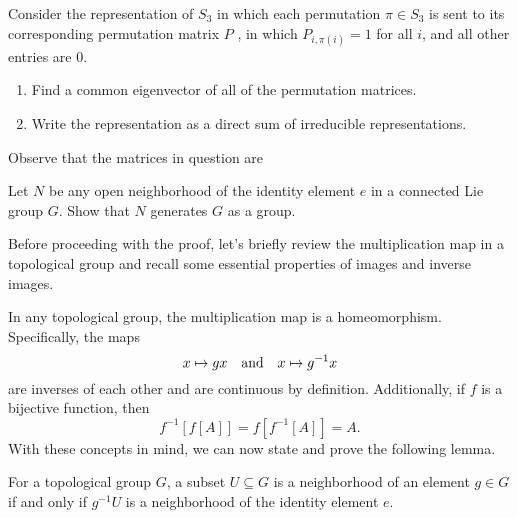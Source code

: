 \documentclass[12pt]{memoir}
\begin{document}
\begin{Ej}
    Consider the representation of $S_3$ in which each permutation $\pi\in S_3$ is sent to its corresponding permutation matrix $P$ , in which $P_{i,\pi(i)}=1$ for all $i$, and all other entries are $0$.
    \begin{enumerate}
        \item Find a common eigenvector of all of the permutation matrices.
        \item Write the representation as a direct sum of irreducible representations.
    \end{enumerate}
\end{Ej}

\begin{ptcbr}
    Observe that the matrices in question are 
\end{ptcbr}
\begin{Ej}
    Let $N$ be any open neighborhood of the identity element $e$ in a connected Lie group $G$.
Show that $N$ generates $G$ as a group.
\end{Ej}



Before proceeding with the proof, let's briefly review the multiplication map in a topological group and recall some essential properties of images and inverse images.

\begin{Rmk}
In any topological group, the multiplication map is a homeomorphism. Specifically, the maps 
$$x \mapsto gx \quad\text{and}\quad x \mapsto g^{-1}x$$
are inverses of each other and are continuous by definition. Additionally, if $f$ is a bijective function, then 
$$f^{-1}[f[A]] = f[f^{-1}[A]] = A.$$
With these concepts in mind, we can now state and prove the following lemma.
\end{Rmk}

\begin{Lem}
For a topological group $G$, a subset $U \subseteq G$ is a neighborhood of an element $g \in G$ if and only if $g^{-1}U$ is a neighborhood of the identity element $e$.
\end{Lem}
\end{document}
